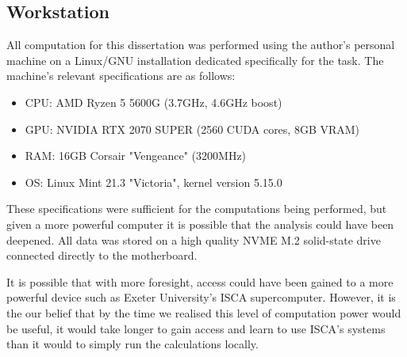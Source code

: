 \documentclass[a4paper,11pt]{article}  %
\begin{document}
	\newpage
	\begin{appendices}
	\section{Workstation}
	\label{app:work}
	All computation for this dissertation was performed using the author's personal machine on a Linux/GNU installation dedicated specifically for the task. The machine's relevant specifications are as follows:
	\begin{itemize}
		\item CPU: AMD Ryzen 5 5600G (3.7GHz, 4.6GHz boost)
		\item GPU: NVIDIA RTX 2070 SUPER (2560 CUDA cores, 8GB VRAM)
		\item RAM: 16GB Corsair "Vengeance" (3200MHz)
		\item OS: Linux Mint 21.3 "Victoria", kernel version 5.15.0
	\end{itemize}
	These specifications were sufficient for the computations being performed, but given a more powerful computer it is possible that the analysis could have been deepened. All data was stored on a high quality NVME M.2 solid-state drive connected directly to the motherboard.
	
	It is possible that with more foresight, access could have been gained to a more powerful device such as Exeter University's ISCA supercomputer. However, it is the our belief that by the time we realised this level of computation power would be useful, it would take longer to gain access and learn to use ISCA's systems than it would to simply run the calculations locally.

\end{appendices}
\end{document}

